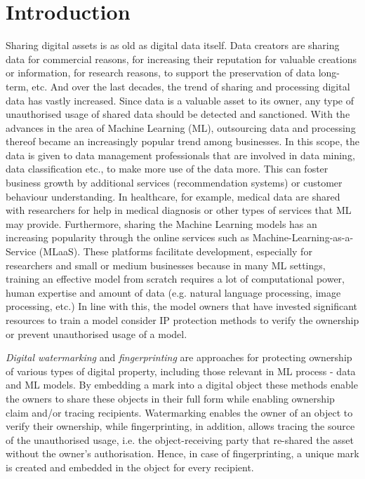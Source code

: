 \documentclass[conference]{IEEEtran}
\begin{document}
\section{Introduction}
Sharing digital assets is as old as digital data itself. 
Data creators are sharing data for commercial reasons, for increasing their reputation for valuable creations or information, for research reasons, to support the preservation of data long-term, etc. 
And over the last decades, the trend of sharing and processing digital data has vastly increased. 
Since data is a valuable asset to its owner, any type of unauthorised usage of shared data should be detected and sanctioned.
With the advances in the area of Machine Learning (ML), outsourcing data and processing thereof became an increasingly popular trend among businesses. 
In this scope, the data is given to data management professionals that are involved in data mining, data classification etc., to make more use of the data more. 
This can foster business growth by additional services (recommendation systems) or customer behaviour understanding. 
In healthcare, for example, medical data are shared with researchers for help in medical diagnosis or other types of services that ML may provide.
Furthermore, sharing the Machine Learning models has an increasing popularity through the online services such as Machine-Learning-as-a-Service (MLaaS). 
These platforms facilitate development, especially for researchers and small or medium businesses because in many ML settings, training an effective model from scratch requires a lot of computational power, human expertise and amount of data (e.g. natural language processing, image processing, etc.)  
In line with this, the model owners that have invested significant resources to train a model consider IP protection methods to verify the ownership or prevent unauthorised usage of a model. 

\textit{Digital watermarking} and \textit{fingerprinting} are approaches for protecting ownership of various types of digital property, including those relevant in ML process - data and ML models. 
By embedding a mark into a digital object these methods enable the owners to share these objects in their full form while enabling ownership claim and/or tracing recipients.
Watermarking enables the owner of an object to verify their ownership, while fingerprinting, in addition, allows tracing the source of the unauthorised usage, i.e. the object-receiving party that re-shared the asset without the owner's authorisation. 
Hence, in case of fingerprinting, a unique mark is created and embedded in the object for every recipient. 
\end{document}
